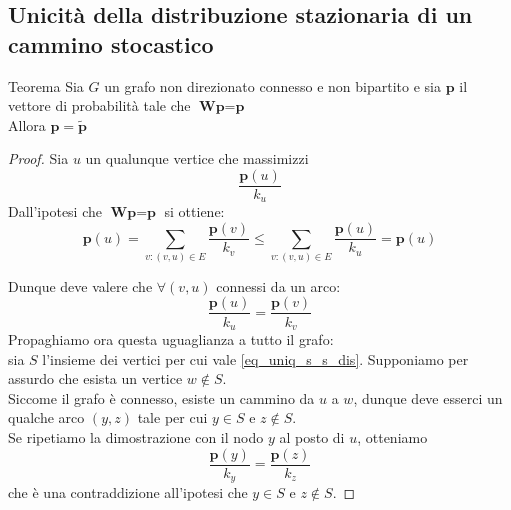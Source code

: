 \subsection{Unicità della distribuzione stazionaria di un cammino stocastico}

\begin{boxl}{Teorema}
Sia $G$ un grafo non direzionato connesso e non bipartito e sia $\textbf{p}$ il vettore di probabilità tale che $\textbf{Wp}=\textbf{p}$\\
Allora $\mathbf{p}=\mathbf{\mathbf{\tilde{p}}}$
\end{boxl}

\begin{proof}
    
Sia $u$ un qualunque vertice che massimizzi
\begin{equation}
    \frac{\textbf{p}(u)}{k_u}
\end{equation}
Dall'ipotesi che $\textbf{Wp}=\textbf{p}$ si ottiene:
\begin{equation}
    \mathbf{p}(u)=\sum_{v:(v,u)\in E}^{}\frac{\mathbf{p}(v)}{k_v} \le \sum_{v:(v,u)\in E}^{}\frac{\mathbf{p}(u)}{k_u}=\mathbf{p}(u)
\end{equation}

Dunque deve valere che $\forall (v,u)$ connessi da un arco:
\begin{equation}
    \frac{\mathbf{p}(u)}{k_u}=\frac{\mathbf{p}(v)}{k_v}
    \label{eq_uniq_s_s_dis}
\end{equation}
Propaghiamo ora questa uguaglianza a tutto il grafo:\\

sia $S$ l'insieme dei vertici per cui vale \ref{eq_uniq_s_s_dis}. Supponiamo per assurdo che esista un vertice $w \notin S$.\\
Siccome il grafo è connesso, esiste un cammino da $u$ a $w$, dunque deve esserci un qualche arco $(y,z)$ tale per cui $y \in S$ e $z \notin S$.\\
Se ripetiamo la dimostrazione con il nodo $y$ al posto di $u$, otteniamo 
\begin{equation}
    \frac{\mathbf{p}(y)}{k_y}=\frac{\mathbf{p}(z)}{k_z}
\end{equation}
che è una contraddizione all'ipotesi che $y \in S$ e $z \notin S$.
\end{proof}


